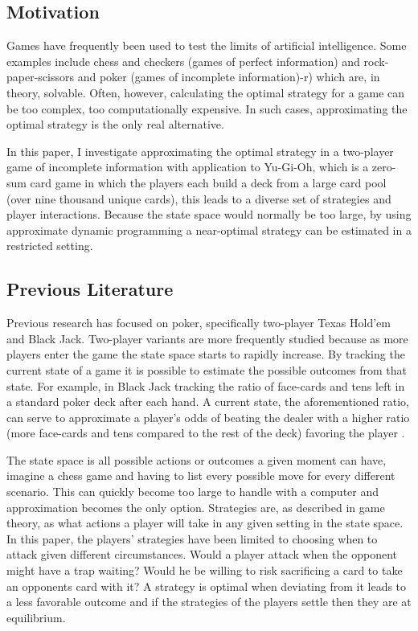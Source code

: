 
\subsection{Motivation}
Games have frequently been used to test the limits of artificial intelligence. Some examples include chess and checkers (games of perfect information) and rock-paper-scissors and poker (games of incomplete information)-r) which are, in theory, solvable. Often, however, calculating the optimal strategy for a game can be too complex, too computationally expensive. In such cases, approximating the optimal strategy is the only real alternative.

In this paper, I investigate approximating the optimal strategy in a two-player game of incomplete information with application to Yu-Gi-Oh, which is a zero-sum card game in which the players each build a deck from a large card pool (over nine thousand unique cards), this leads to a diverse set of strategies and player interactions. Because the state space would normally be too large, by using approximate dynamic programming a near-optimal strategy can be estimated in a restricted setting.


\subsection{Previous Literature}
Previous research has focused on poker, specifically two-player Texas Hold'em and Black Jack. Two-player variants are more frequently studied because as more players enter the game the state space starts to rapidly increase. By tracking the current state of a game it is possible to estimate the possible outcomes from that state. For example, in Black Jack tracking the ratio of face-cards and tens left in a standard poker deck after each hand. A current state, the aforementioned ratio, can serve to approximate a player's odds of beating the dealer with a higher ratio (more face-cards and tens compared to the rest of the deck) favoring the player \citep{Thorp:2017}.

The state space is all possible actions or outcomes a given moment can have, imagine a chess game and having to list every possible move for every different scenario. This can quickly become too large to handle with a computer and approximation becomes the only option. Strategies are, as described in game theory, as what actions a player will take in any given setting in the state space. In this paper, the players' strategies have been limited to choosing when to attack given different circumstances. Would a player attack when the opponent might have a trap waiting? Would he be willing to risk sacrificing a card to take an opponents card with it? A strategy is optimal when deviating from it leads to a less favorable outcome and if the strategies of the players settle then they are at equilibrium.

